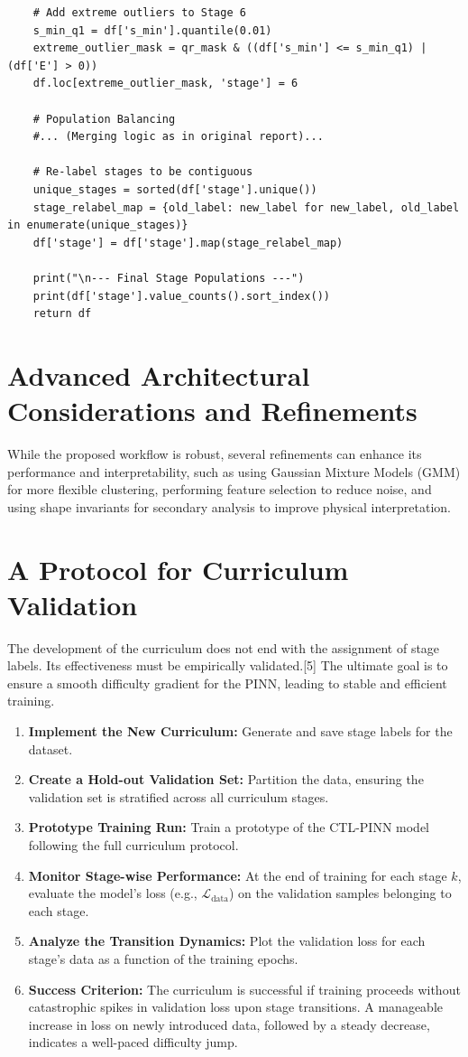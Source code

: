 \documentclass[11pt, letterpaper]{article}
\begin{document}
\begin{lstlisting}
    # Add extreme outliers to Stage 6
    s_min_q1 = df['s_min'].quantile(0.01)
    extreme_outlier_mask = qr_mask & ((df['s_min'] <= s_min_q1) | (df['E'] > 0))
    df.loc[extreme_outlier_mask, 'stage'] = 6
    
    # Population Balancing
    #... (Merging logic as in original report)...
    
    # Re-label stages to be contiguous
    unique_stages = sorted(df['stage'].unique())
    stage_relabel_map = {old_label: new_label for new_label, old_label in enumerate(unique_stages)}
    df['stage'] = df['stage'].map(stage_relabel_map)
    
    print("\n--- Final Stage Populations ---")
    print(df['stage'].value_counts().sort_index())
    return df
\end{lstlisting}

\section{Advanced Architectural Considerations and Refinements}

While the proposed workflow is robust, several refinements can enhance its performance and interpretability, such as using Gaussian Mixture Models (GMM) for more flexible clustering, performing feature selection to reduce noise, and using shape invariants for secondary analysis to improve physical interpretation.

\section{A Protocol for Curriculum Validation}

The development of the curriculum does not end with the assignment of stage labels. Its effectiveness must be empirically validated.[5] The ultimate goal is to ensure a smooth difficulty gradient for the PINN, leading to stable and efficient training.
\begin{enumerate}
    \item \textbf{Implement the New Curriculum:} Generate and save stage labels for the dataset.
    \item \textbf{Create a Hold-out Validation Set:} Partition the data, ensuring the validation set is stratified across all curriculum stages.
    \item \textbf{Prototype Training Run:} Train a prototype of the CTL-PINN model following the full curriculum protocol.
    \item \textbf{Monitor Stage-wise Performance:} At the end of training for each stage $k$, evaluate the model's loss (e.g., $\mathcal{L}_{\text{data}}$) on the validation samples belonging to each stage.
    \item \textbf{Analyze the Transition Dynamics:} Plot the validation loss for each stage's data as a function of the training epochs.
    \item \textbf{Success Criterion:} The curriculum is successful if training proceeds without catastrophic spikes in validation loss upon stage transitions. A manageable increase in loss on newly introduced data, followed by a steady decrease, indicates a well-paced difficulty jump.
\end{enumerate}
\end{document}
